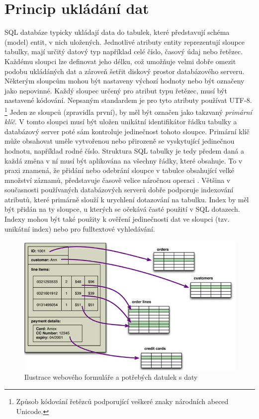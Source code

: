 \section{Princip ukládání dat}
SQL databáze typicky ukládají data do tabulek, které představují schéma (model) entit, v nich uložených. Jednotlivé atributy entity reprezentují sloupce tabulky, mají určitý datový typ například celé číslo, časový údaj nebo řetězec. Každému sloupci lze definovat jeho délku, což umožňuje velmi dobře omezit podobu ukládáných dat a zároveň šetřit diskový prostor databázového serveru. Některým sloupcům mohou být nastaveny výchozí hodnoty nebo být označeny jako nepovinné. Každý sloupec určený pro atribut typu řetězec, musí být nastavené kódování. Nepsaným standardem je pro tyto atributy používat UTF-8. \footnote{Způsob kódování řetězců podporující veškeré znaky národních abeced Unicode.} Jeden ze sloupců (zpravidla první), by měl být označen jako takzvaný \emph{primární klíč}. V tomto sloupci musí být uložen unikátní identifikátor řádku tabulky a databázový server poté sám kontroluje jedinečnost tohoto sloupce. Primární klíč může obsahovat uměle vytvořenou nebo přirozeně se vyskytující jedinečnou hodnotu, například rodné číslo. Struktura SQL tabulky je tedy předem daná a každá změna v ní musí být aplikována na všechny řádky, které obsahuje. To v praxi znamená, že přidání nebo odebrání sloupce v tabulce obsahující velké množství záznamů, představuje časově velice náročnou operaci \cite{mysqlDataTypes}.
Většina v současnosti používaných databázových serverů dobře podporuje indexování atributů, které primárně slouží k urychlení dotazování na tabulku. Index by měl být přidán na ty sloupce, u kterých se očekává časté použití v SQL dotazech. Indexy mohou být také použity k ověření jedinečnosti dat ve sloupci (tzv. unikátní index) nebo pro fulltextové vyhledávání.

\begin{figure}[h]
\begin{centering}
\includegraphics[scale=0.5]{obrazky/data2table}
\par\end{centering}
\caption{Ilustrace webového formuláře a potřebých datulek s daty \cite{nosqlDistilled} \label{fig:data2table}}
\end{figure}

